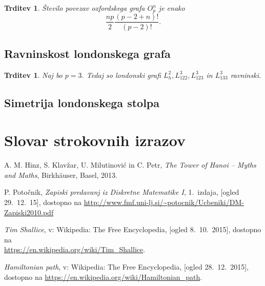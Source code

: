 \documentclass[12pt,a4paper]{amsart}
\theoremstyle{definition} %
\theoremstyle{plain} %
\newtheorem{trditev}[definicija]{Trditev}
\newcommand{\geslo}[2]{\noindent\textbf{#1}\hspace*{3mm}\hangindent=\parindent\hangafter=1 #2}
\begin{document}
\begin{trditev}
    Število povezav oxfordskega grafa $O^n_p$ je enako
    \[ \frac{np}{2} \frac{(p-2+n)!}{(p-2)!} .\]
\end{trditev}

\subsection{Ravninskost londonskega grafa}

\begin{trditev}
    Naj bo $p=3$. Tedaj so londonski grafi $L_h^2, L_{122}^3,L_{123}^3$ in $ L_{133}^3$ ravninski.
\end{trditev}

\subsection{Simetrija londonskega stolpa}

\section*{Slovar strokovnih izrazov}

%
%

\begin{thebibliography}{99}

 A. M. Hinz, S. Klavžar, U. Milutinović in C. Petr, \emph{The Tower of Hanoi – Myths and Maths}, Birkhäuser, Basel, 2013.

 P. Potočnik, \emph{Zapiski predavanj iz Diskretne Matematike I}, 1.~izdaja, [ogled 29.~12.~15], dostopno na \url{http://www.fmf.uni-lj.si/~potocnik/Ucbeniki/DM-Zapiski2010.pdf}

 \emph{Tim Shallice}, v: Wikipedia: The Free Encyclopedia, [ogled 8.~10.~2015], dostopno na\\ \url{https://en.wikipedia.org/wiki/Tim_Shallice}.

 \emph{Hamiltonian path}, v: Wikipedia: The Free Encyclopedia, [ogled 28.~12.~2015], dostopno na \url{https://en.wikipedia.org/wiki/Hamiltonian_path}.
\end{thebibliography}
\end{document}
